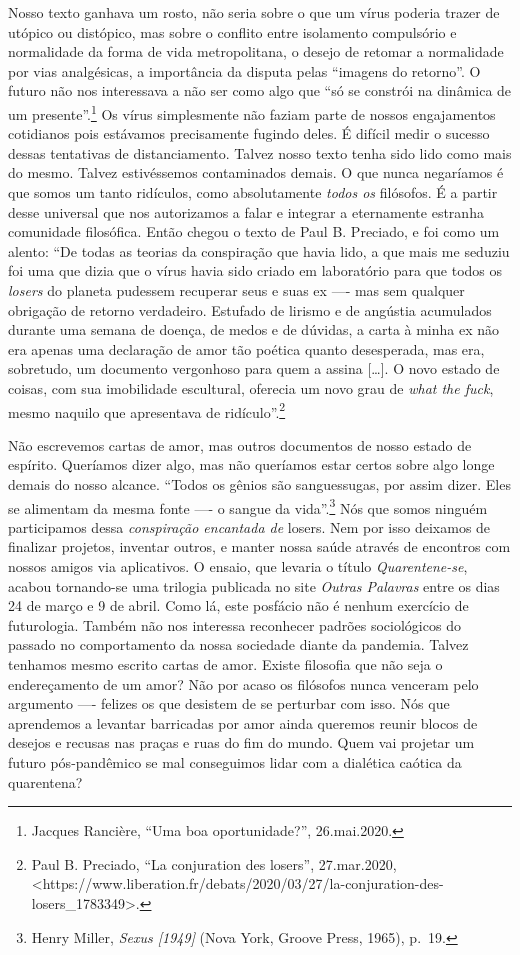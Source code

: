 Nosso texto ganhava um rosto, não seria sobre o que um vírus poderia
trazer de utópico ou distópico, mas sobre o conflito entre isolamento
compulsório e normalidade da forma de vida metropolitana, o desejo de
retomar a normalidade por vias analgésicas, a importância da disputa
pelas ``imagens do retorno''. O futuro não nos interessava a não ser
como algo que ``só se constrói na dinâmica de um presente''.\footnote{Jacques
  Rancière, ``Uma boa oportunidade?'', 26.mai.2020.}
Os vírus simplesmente não faziam parte de nossos engajamentos cotidianos
pois estávamos precisamente fugindo deles. É difícil medir o sucesso
dessas tentativas de distanciamento. Talvez nosso texto tenha sido lido
como mais do mesmo. Talvez estivéssemos contaminados demais. O que nunca
negaríamos é que somos um tanto ridículos, como absolutamente
\textit{todos os} filósofos. É a partir desse universal que nos
autorizamos a falar e integrar a eternamente estranha comunidade
filosófica. Então chegou o texto de Paul B. Preciado, e foi como um
alento: ``De todas as teorias da conspiração que havia lido, a que mais
me seduziu foi uma que dizia que o vírus havia sido criado em
laboratório para que todos os \textit{losers} do planeta pudessem
recuperar seus e suas ex ---- mas sem qualquer obrigação de retorno
verdadeiro. Estufado de lirismo e de angústia acumulados durante uma
semana de doença, de medos e de dúvidas, a carta à minha ex não era
apenas uma declaração de amor tão poética quanto desesperada, mas era,
sobretudo, um documento vergonhoso para quem a assina {[}\dots{}{]}. O novo
estado de coisas, com sua imobilidade escultural, oferecia um novo grau
de \textit{what the fuck}, mesmo naquilo que apresentava de
ridículo''.\footnote{Paul B. Preciado, ``La conjuration des losers'',
  27.mar.2020,
  \textless{}https://www.liberation.fr/debats/2020/03/27/la-conjuration-des-losers\_1783349{\textgreater{}.}}

Não escrevemos cartas de amor, mas outros documentos de nosso estado de
espírito. Queríamos dizer algo, mas não queríamos estar certos sobre
algo longe demais do nosso alcance. ``Todos os gênios são sanguessugas,
por assim dizer. Eles se alimentam da mesma fonte ---- o sangue da
vida''.\footnote{Henry Miller, \textit{Sexus {[}1949{]}} (Nova York,
  Groove Press, 1965), p.~19.} Nós que somos ninguém participamos dessa
\textit{conspiração encantada de} losers. Nem por isso deixamos de
finalizar projetos, inventar outros, e manter nossa saúde através de
encontros com nossos amigos via aplicativos. O ensaio, que levaria o
título \textit{Quarentene-se}, acabou tornando-se uma trilogia publicada
no site \textit{Outras Palavras} entre os dias 24 de março e 9 de abril.
Como lá, este posfácio não é nenhum exercício de futurologia. Também não
nos interessa reconhecer padrões sociológicos do passado no
comportamento da nossa sociedade diante da pandemia. Talvez tenhamos
mesmo escrito cartas de amor. Existe filosofia que não seja o
endereçamento de um amor? Não por acaso os filósofos nunca venceram pelo
argumento ---- felizes os que desistem de se perturbar com isso. Nós que
aprendemos a levantar barricadas por amor ainda queremos reunir blocos
de desejos e recusas nas praças e ruas do fim do mundo. Quem vai
projetar um futuro pós-pandêmico se mal conseguimos lidar com a
dialética caótica da quarentena?

